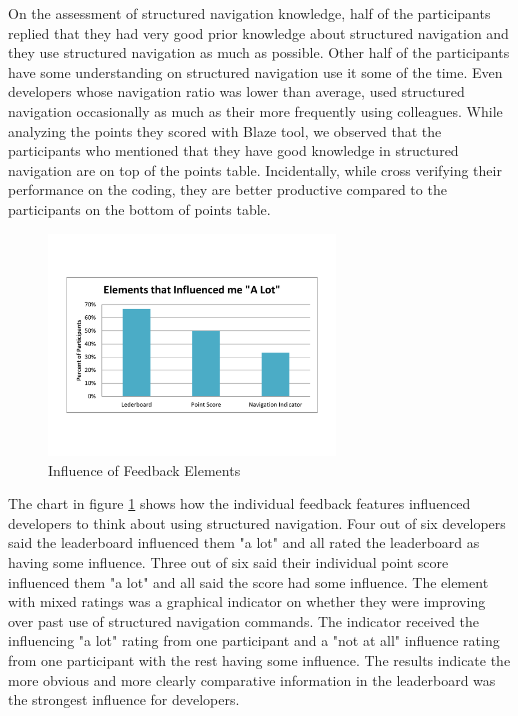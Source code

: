 \documentclass{sig-alternate}
\begin{document}
On the assessment of structured navigation knowledge, half of the participants replied that they had very good prior knowledge about structured navigation and they use structured navigation as much as possible.  Other half of the participants have some understanding on structured navigation use it some of the time. Even developers whose navigation ratio  was lower than average, used structured navigation occasionally as much as their more frequently using colleagues.  While analyzing the points they scored with Blaze tool, we observed that the participants who mentioned that they have good knowledge in structured navigation are on top of the points table. 
Incidentally, while cross verifying their performance on the coding, they are better productive compared to the participants on the bottom of points table.
\begin{figure}\begin{mdframed}[linecolor=white]
	\includegraphics[width=3in]{ElementInfluenceChart.pdf}
	\caption{Influence of Feedback Elements}
	\label{fig:elementInfluence}
\end{mdframed}\end{figure}

The chart in figure \ref{fig:elementInfluence} shows how the individual feedback features influenced developers to think about using structured navigation.  Four out of six developers said the leaderboard influenced them "a lot" and all rated the leaderboard as having some influence.  Three out of six  said their individual point score influenced them "a lot" and all said the score had some influence.  The element with mixed ratings was a graphical indicator on whether they were improving over past use of structured navigation commands.  The indicator received the influencing "a lot" rating from one participant and a "not at all" influence rating from one participant with the rest having some influence.  The results indicate the more obvious and more clearly comparative information in the leaderboard was the strongest influence for developers.
\end{document}
